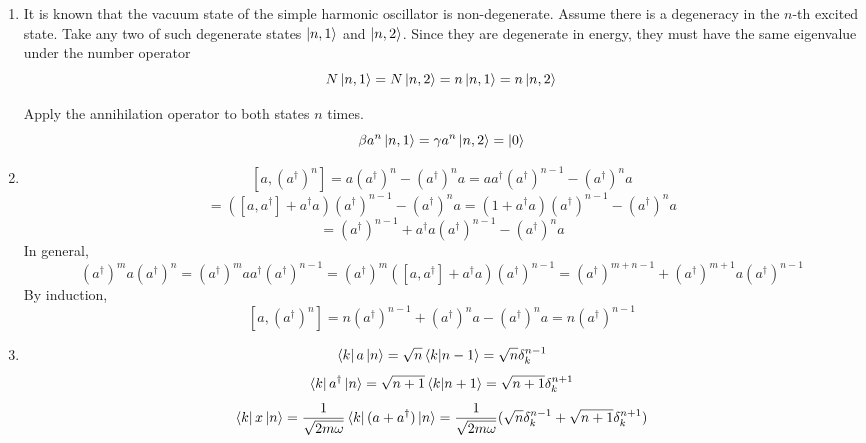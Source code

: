 \begin{sol}
\begin{enumerate}[label=\textbf{(\alph*)}]
\item
It is known that the vacuum state of the simple harmonic oscillator is non-degenerate. Assume there is a degeneracy in the $n$-th excited state. Take any two of such degenerate states $\ket{n,1}$ and $\ket{n,2}$. Since they are degenerate in energy, they must have the same eigenvalue under the number operator
$$N\ket{n,1}=N\ket{n,2}=n\ket{n,1}=n\ket{n,2}$$

Apply the annihilation operator to both states $n$ times.
$$\beta a^n\ket{n,1}=\gamma a^n\ket{n,2}=\ket 0$$ 
\item
$$[a,(a^\dagger)^n]=a(a^\dagger)^n-(a^\dagger)^na=aa^\dagger(a^\dagger)^{n-1}-(a^\dagger)^na$$ $$=([a,a^\dagger]+a^\dagger a)(a^\dagger)^{n-1}-(a^\dagger)^na=(1+a^\dagger a)(a^\dagger)^{n-1}-(a^\dagger)^na$$
$$=(a^\dagger)^{n-1}+a^\dagger a(a^\dagger)^{n-1}-(a^\dagger)^na$$ 
In general, 
$$(a^\dagger)^ma(a^\dagger)^n=(a^\dagger)^maa^\dagger(a^\dagger)^{n-1}=(a^\dagger)^{m}([a,a^\dagger]+a^\dagger a)(a^\dagger)^{n-1}=(a^\dagger)^{m+n-1}+(a^\dagger)^{m+1}a(a^\dagger)^{n-1}$$
By induction, 
$$[a,(a^\dagger)^n]=n(a^\dagger)^{n-1}+(a^\dagger)^na-(a^\dagger)^na=n(a^\dagger)^{n-1}$$ 
\item
$$\bra ka\ket n=\sqrt n\braket{k}{n-1}=\sqrt n\delta_k^{n-1}$$ 
$$\bra ka^\dagger\ket n=\sqrt{n+1}\braket{k}{n+1}=\sqrt{n+1}\delta_k^{n+1}$$
$$\bra kx\ket n=\frac{1}{\sqrt{2m\omega}}\bra k(a+a^\dagger)\ket n=\frac{1}{\sqrt{2m\omega}}(\sqrt n\delta_k^{n-1}+\sqrt{n+1}\delta_k^{n+1})$$


\end{enumerate}
\end{sol}
